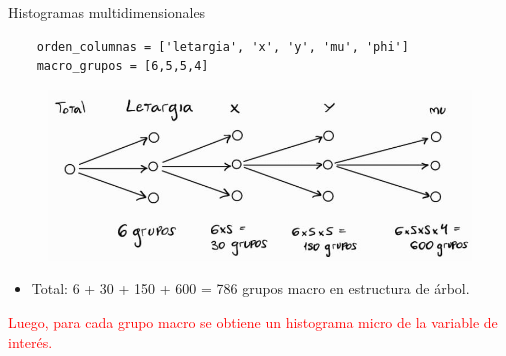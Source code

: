 \documentclass[aspectratio=169,english]{beamer}
\begin{document}
\begin{frame}[fragile]{Histogramas multidimensionales}

    \begin{verbatim}
    orden_columnas = ['letargia', 'x', 'y', 'mu', 'phi']
    macro_grupos = [6,5,5,4]
    \end{verbatim}

    \begin{figure}
        \centering
        \includegraphics[width=0.7\linewidth]{imagens/esquema3.jpeg}
        \label{fig:esquema31}
    \end{figure}

    \begin{itemize}
        \item Total: 6 + 30 + 150 + 600 = 786 grupos macro en estructura de árbol.
    \end{itemize}
    \textcolor{red}{Luego, para cada grupo macro se obtiene un histograma micro de la variable de interés.}

\end{frame}
\end{document}

